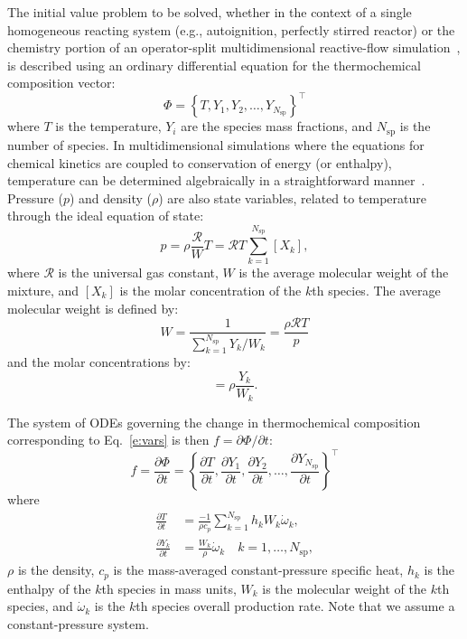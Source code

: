 \documentclass[preprint,12pt]{elsarticle}
\newcommand{ \ddt } [1] { \frac{ \partial #1 }{ \partial t } }
\begin{document}
The initial value problem to be solved, whether in the context of a single homogeneous reacting system (e.g., autoignition, perfectly stirred reactor) or the chemistry portion of an operator-split multidimensional reactive-flow simulation~\cite{Oran:2001aa}, is described using an ordinary differential equation for the thermochemical composition vector:
\begin{equation}
\label{e:vars}
\Phi = \left \lbrace T, Y_1, Y_2, \dotsc, Y_{N_{\text{sp}}} \right \rbrace^{\intercal}
\end{equation}
where $T$ is the temperature, $Y_i$ are the species mass fractions, and $N_{\text{sp}}$ is the number of species. 
In multidimensional simulations where the equations for chemical kinetics are coupled to conservation of energy (or enthalpy), temperature can be determined algebraically in a straightforward manner~\cite{Oran:2001aa}.
Pressure ($p$) and density ($\rho$) are also state variables, related to temperature through the ideal equation of state:
\begin{equation}
\label{e:state}
p = \rho \frac{\mathcal{R}}{W} T = \mathcal{R} T \sum_{k=1}^{N_{\text{sp}}} [X_k] ,
\end{equation}
where $\mathcal{R}$ is the universal gas constant, $W$ is the average molecular weight of the mixture, and $[X_k]$ is the molar concentration of the $k$th species.
The average molecular weight is defined by:
\begin{equation}
W = \frac{1}{\sum_{k=1}^{N_{\text{sp}}} Y_k / W_k} = \frac{\rho \mathcal{R} T}{p}
\end{equation}
and the molar concentrations by:
\begin{equation}
[X_k] = \rho \frac{Y_k}{W_k} .
\end{equation}

The system of ODEs governing the change in thermochemical composition corresponding to Eq.~\eqref{e:vars} is then $ f = \partial \Phi/ \partial t$:
\begin{equation}
f = \ddt{\Phi} = \left \lbrace \ddt{T}, \ddt{Y_1}, \ddt{Y_2}, \dotsc, \ddt{Y_{N_{\text{sp}}}} \right \rbrace^{\intercal}
\label{e:ode}
\end{equation}
where
\begin{align}
\ddt{T} &= \frac{-1}{\rho c_p} \sum_{k=1}^{N_{\text{sp}}} h_k W_k \dot{\omega}_k , \\
\ddt{Y_k} &= \frac{W_k}{\rho} \dot{\omega}_k \quad k = 1, \dotsc, N_{\text{sp}}, \label{e:dTdt}
\end{align}
$\rho$ is the density, $c_p$ is the mass-averaged constant-pressure specific heat, $h_k$ is the enthalpy of the $k$th species in mass units, $W_k$ is the molecular weight of the $k$th species, and $\dot{\omega}_k$ is the $k$th species overall production rate.
Note that we assume a constant-pressure system.
\end{document}
